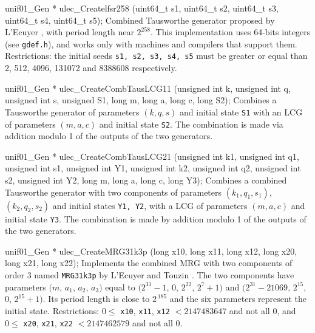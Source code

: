 unif01_Gen * ulec_Createlfsr258 (uint64_t s1, uint64_t s2, uint64_t s3,
                                 uint64_t s4, uint64_t s5);
\endcode
 \tab Combined Tausworthe generator proposed by L'Ecuyer \cite{rLEC99a},
%
   with period length near $2^{258}$.
   This implementation uses 64-bits integers (see {\tt gdef.h}),
   and works only with machines and compilers that support them.
 Restrictions: the initial seeds  \texttt{s1, s2, s3, s4, s5}
   must be greater or equal than 2, 512, 4096, 131072 and 8388608 respectively.
 \endtab
\code


unif01_Gen * ulec_CreateCombTausLCG11 (unsigned int k, unsigned  int q,
                                       unsigned int s, unsigned S1,
                                       long m, long a, long c, long S2);
\endcode
  \tab  Combines a Tausworthe generator of parameters
   $(k, q, s)$ and initial state {\tt S1} with an  LCG
   of parameters $(m, a, c)$ and initial state {\tt S2}.
   The combination is made via addition  modulo 1 of the outputs
   of the two generators.
  \endtab
\code


unif01_Gen * ulec_CreateCombTausLCG21 (unsigned int k1, unsigned int q1,
                                       unsigned int s1, unsigned int Y1,
                                       unsigned int k2, unsigned int q2,
                                       unsigned int s2, unsigned int Y2,
                                       long m, long a, long c, long Y3);
\endcode
  \tab  Combines a combined Tausworthe generator with two components
   of parameters
   $(k_1, q_1, s_1)$,  $(k_2, q_2, s_2)$ and initial states
   {\tt Y1, Y2}, with a LCG of parameters
   $(m, a, c)$ and initial state {\tt Y3}.
   The combination is made by addition modulo 1 of the outputs
   of the two generators.
  \endtab
\code


unif01_Gen * ulec_CreateMRG31k3p (long x10, long x11, long x12,
                                  long x20, long x21, long x22);
\endcode
 \tab  Implements the combined MRG  with two components of order 3
  named {\tt MRG31k3p} by L'Ecuyer and Touzin \cite{rLEC00b}.
%
  The two components have parameters $(m$, $a_1$, $a_2$, $a_3)$ equal to
  $(2^{31} - 1$, $0$, $2^{22}$, $2^7 +1)$ and
  $(2^{31} - 21069$, $2^{15}$, $0$, $2^{15} +1)$.
  Its period length is close to $2^{\,185}$ and the six parameters
  represent the initial state. Restrictions:
  $0 \le {}$ {\tt x10}, {\tt x11}, {\tt x12} ${} < 2147483647$ and not all 0,
  and $0 \le {}$ {\tt x20}, {\tt x21}, {\tt x22} ${} < 2147462579$
  and not all 0.
 \endtab

